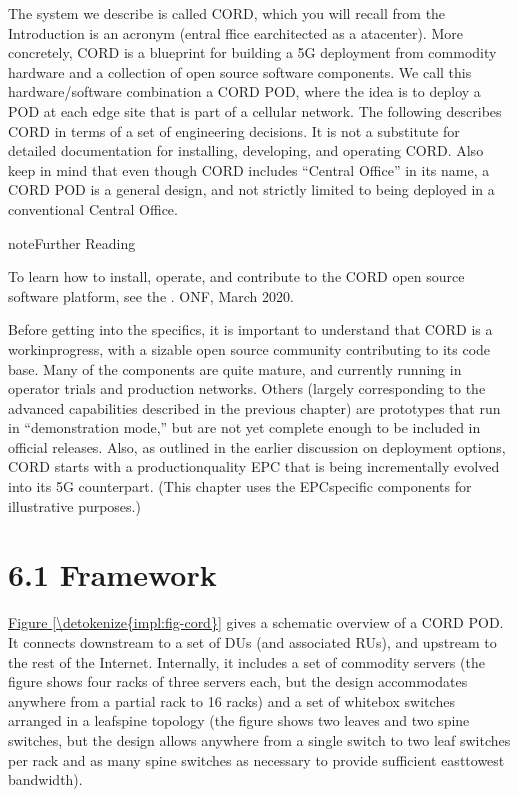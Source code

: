 \documentclass[a4paper,11pt,english]{sphinxmanual}
\begin{document}
\sphinxAtStartPar
The system we describe is called CORD, which you will recall from the
Introduction is an acronym (entral ffice
e\sphinxhyphen{}architected as a atacenter). More concretely, CORD is a
blueprint for building a 5G deployment from commodity hardware and a
collection of open source software components. We call this
hardware/software combination a CORD POD, where the idea is to deploy a
POD at each edge site that is part of a cellular network. The following
describes CORD in terms of a set of engineering decisions. It is not a
substitute for detailed documentation for installing, developing, and
operating CORD. Also keep in mind that even though CORD includes
“Central Office” in its name, a CORD POD is a general design, and not
strictly limited to being deployed in a conventional Central Office.

\label{\detokenize{impl:reading-guide}}
\begin{sphinxadmonition}{note}{Further Reading}

\sphinxAtStartPar
To learn how to install, operate, and contribute to the CORD open
source software platform, see the . ONF, March 2020.
\end{sphinxadmonition}

\sphinxAtStartPar
Before getting into the specifics, it is important to understand that
CORD is a work\sphinxhyphen{}in\sphinxhyphen{}progress, with a sizable open source community
contributing to its code base. Many of the components are quite mature,
and currently running in operator trials and production networks. Others
(largely corresponding to the advanced capabilities described in the
previous chapter) are prototypes that run in “demonstration mode,” but
are not yet complete enough to be included in official releases. Also,
as outlined in the earlier discussion on deployment options, CORD starts
with a production\sphinxhyphen{}quality EPC that is being incrementally evolved into
its 5G counterpart. (This chapter uses the EPC\sphinxhyphen{}specific components for
illustrative purposes.)


\section{6.1 Framework}
\label{\detokenize{impl:framework}}
\sphinxAtStartPar
\hyperref[\detokenize{impl:fig-cord}]{Figure \ref{\detokenize{impl:fig-cord}}} gives a schematic overview of a CORD POD. It
connects downstream to a set of DUs (and associated RUs), and upstream
to the rest of the Internet. Internally, it includes a set of commodity
servers (the figure shows four racks of three servers each, but the
design accommodates anywhere from a partial rack to 16 racks) and a set
of white\sphinxhyphen{}box switches arranged in a leaf\sphinxhyphen{}spine topology (the figure
shows two leaves and two spine switches, but the design allows anywhere
from a single switch to two leaf switches per rack and as many spine
switches as necessary to provide sufficient east\sphinxhyphen{}to\sphinxhyphen{}west bandwidth).
\end{document}
